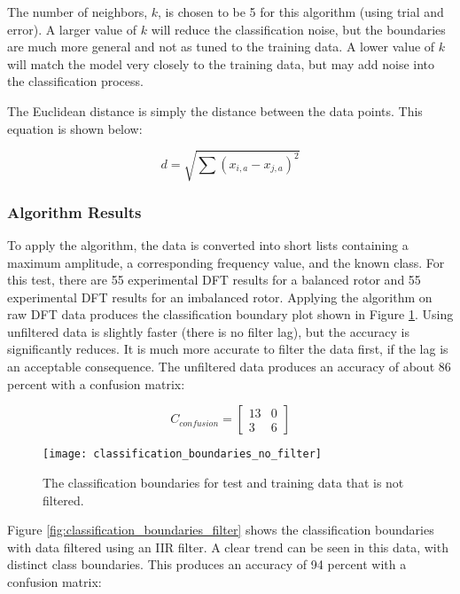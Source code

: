 The number of neighbors, $k$, is chosen to be 5 for this algorithm (using trial and error).  A larger value of $k$ will reduce the classification noise, but the boundaries are much more general and not as tuned to the training data.  A lower value of $k$ will match the model very closely to the training data, but may add noise into the classification process.

The Euclidean distance is simply the distance between the data points.  This equation is shown below:

\begin{equation}
	d = \sqrt{\sum{\left(x_{i,a}-x_{j,a}\right)^2}}
\end{equation}

\subsubsection{Algorithm Results}
To apply the algorithm, the data is converted into short lists containing a maximum amplitude, a corresponding frequency value, and the known class. For this test, there are 55 experimental DFT results for a balanced rotor and 55 experimental DFT results for an imbalanced rotor.  Applying the algorithm on raw DFT data produces the classification boundary plot shown in Figure \ref{fig:classification_boundaries_no_filter}.  Using unfiltered data is slightly faster (there is no filter lag), but the accuracy is significantly reduces.  It is much more accurate to filter the data first, if the lag is an acceptable consequence.  The unfiltered data produces an accuracy of about 86 percent with a confusion matrix:


\begin{equation}
C_{confusion} = 
\begin{bmatrix}
	13 & 0 \\
	3 & 6
\end{bmatrix}
\end{equation}

\begin{figure}
	\centering
	\texttt{[image: classification\_boundaries\_no\_filter]}
	\decoRule
	\caption{The classification boundaries for test and training data that is not filtered.}
	\label{fig:classification_boundaries_no_filter}
\end{figure}

Figure \ref{fig:classification_boundaries_filter} shows the classification boundaries with data filtered using an IIR filter.  A clear trend can be seen in this data, with distinct class boundaries.  This produces an accuracy of 94 percent with a confusion matrix:

